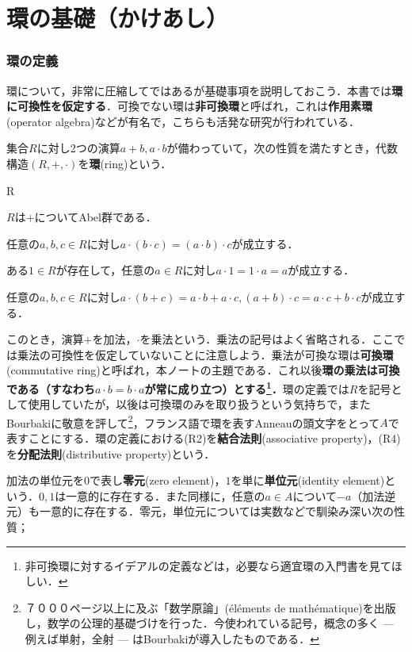 \setcounter{part}{-1}
\part[Definition of Ring and more...]{環の基礎（かけあし）}
\section{環の定義}

環について，非常に圧縮してではあるが基礎事項を説明しておこう．本書では\textbf{環に可換性を仮定する}．可換でない環は\textbf{非可換環}と呼ばれ，これは\textbf{作用素環}(operator algebra)などが有名で，こちらも活発な研究が行われている．
\begin{defi}[環]
	集合$R$に対し2つの演算$a+b,a\cdot b$が備わっていて，次の性質を満たすとき，代数構造$(R,+,\cdot)$を\textbf{環}(ring)という．
	\begin{defiterm}{R}
		\item $R$は$+$についてAbel群である．
		\item 任意の$a,b,c\in R$に対し$a\cdot (b\cdot c)=(a\cdot b)\cdot c$が成立する．
		\item ある$1\in R$が存在して，任意の$a\in R$に対し$a\cdot 1=1\cdot a=a$が成立する．
		\item 任意の$a,b,c\in R$に対し$a\cdot (b+c)=a\cdot b+a\cdot c, (a+b)\cdot c=a\cdot c+b\cdot c$が成立する．
	\end{defiterm}
\end{defi}

このとき，演算$+$を加法，$\cdot$を乗法という．乗法の記号はよく省略される．ここでは乗法の可換性を仮定していないことに注意しよう．乗法が可換な環は\textbf{可換環}(commutative ring)と呼ばれ，本ノートの主題である．これ以後\textbf{環の乗法は可換である（すなわち$a\cdot b=b\cdot a$が常に成り立つ）とする\footnote{非可換環に対するイデアルの定義などは，必要なら適宜環の入門書を見てほしい．}．}環の定義では$R$を記号として使用していたが，以後は可換環のみを取り扱うという気持ちで，またBourbakiに敬意を評して\footnote{７０００ページ以上に及ぶ「数学原論」(\'el\'ements de math\'ematique)を出版し，数学の公理的基礎づけを行った．今使われている記号，概念の多く --- 例えば単射，全射 --- はBourbakiが導入したものである．}，フランス語で環を表すAnneauの頭文字をとって$A$で表すことにする．環の定義における(R2)を\textbf{結合法則}(associative property)，(R4)を\textbf{分配法則}(distributive property)という．

加法の単位元を$0$で表し\textbf{零元}(zero element)，$1$を単に\textbf{単位元}(identity element)という．$0,1$は一意的に存在する．また同様に，任意の$a\in A$について$-a$（加法逆元）も一意的に存在する．零元，単位元については実数などで馴染み深い次の性質；

